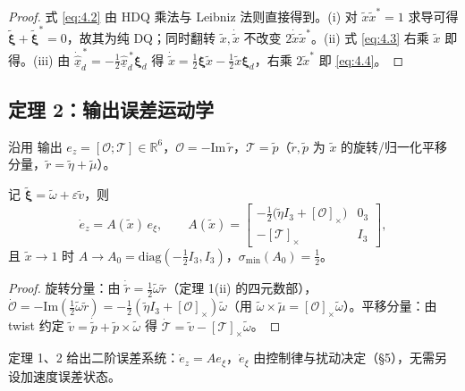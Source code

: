 \begin{proof}
式 \eqref{eq:4.2} 由 HDQ 乘法与 Leibniz 法则直接得到。(i) 对 $\tilde x\tilde x^*=1$ 求导可得 $\tilde{\boldsymbol\xi}+\tilde{\boldsymbol\xi}^*=0$，故其为纯 DQ；同时翻转 $\tilde x,\dot{\tilde x}$ 不改变 $2\dot{\tilde x}\tilde x^*$。(ii) 式 \eqref{eq:4.3} 右乘 $\tilde x$ 即得。(iii) 由 $\dot{\hat{\underline x}}_d^{\,*}=-\tfrac12\hat{\underline x}_d^{\,*}\boldsymbol\xi_d$ 得 $\dot{\tilde x}=\tfrac12\boldsymbol\xi\tilde x-\tfrac12\tilde x\boldsymbol\xi_d$，右乘 $2\tilde x^*$ 即 \eqref{eq:4.4}。
\end{proof}

\subsection{定理 2：输出误差运动学}

沿用 \cite{P2} 输出 $e_z=[\mathcal O;\mathcal T]\in\mathbb R^6$，$\mathcal O=-\mathrm{Im}\,\tilde r$，$\mathcal T=\tilde p$（$\tilde r,\tilde p$ 为 $\tilde x$ 的旋转/归一化平移分量，$\tilde r=\tilde\eta+\tilde\mu$）。

\begin{theorem}[输出误差运动学闭式]\label{thm:2}
记 $\tilde{\boldsymbol\xi}=\tilde\omega+\varepsilon\tilde v$，则
\begin{equation}
\dot e_z=A(\tilde x)\,e_\xi,
\qquad
A(\tilde x)=
\begin{bmatrix}
-\tfrac12\bigl(\tilde\eta I_3+[\mathcal O]_\times\bigr) & 0_3\\[2pt]
-[\mathcal T]_\times & I_3
\end{bmatrix},
\tag{4.5}\label{eq:4.5}
\end{equation}
且 $\tilde x\to1$ 时 $A\to A_0=\mathrm{diag}(-\tfrac12I_3,I_3)$，$\sigma_{\min}(A_0)=\tfrac12$。
\end{theorem}

\begin{proof}
旋转分量：由 $\dot{\tilde r}=\tfrac12\tilde\omega\tilde r$（定理 1(ii) 的四元数部），$\dot{\mathcal O}=-\mathrm{Im}(\tfrac12\tilde\omega\tilde r)=-\tfrac12(\tilde\eta I_3+[\mathcal O]_\times)\tilde\omega$（用 $\tilde\omega\times\tilde\mu=[\mathcal O]_\times\tilde\omega$）。平移分量：由 twist 约定 $\tilde v=\dot{\tilde p}+\tilde p\times\tilde\omega$ 得 $\dot{\mathcal T}=\tilde v-[\mathcal T]_\times\tilde\omega$。
\end{proof}

定理 1、2 给出二阶误差系统：$\dot e_z=Ae_\xi$，$\dot e_\xi$ 由控制律与扰动决定（§5），无需另设加速度误差状态。
